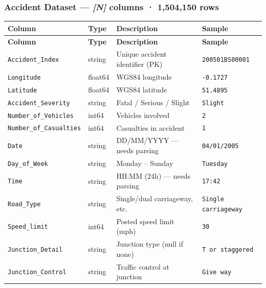 \documentclass[12pt, a4paper]{article}
\newcommand{\ph}[1]{{\color{phred}\textit{[#1]}}}
\begin{document}
\subsubsection{Accident Dataset — \ph{N} columns · 1,504,150 rows}

\begin{center}
\small
\renewcommand{\arraystretch}{1.3}
\begin{longtable}{L{4.2cm} C{2.2cm} L{4.5cm} L{2.6cm}}
\toprule
\textbf{Column} & \textbf{Type} & \textbf{Description} & \textbf{Sample} \\
\midrule
\endfirsthead
\toprule
\textbf{Column} & \textbf{Type} & \textbf{Description} & \textbf{Sample} \\
\midrule
\endhead
\bottomrule
\endlastfoot

\texttt{Accident\_Index}      & string  & Unique accident identifier (PK) & \texttt{200501BS00001} \\
\texttt{Longitude}            & float64 & WGS84 longitude                 & \texttt{-0.1727} \\
\texttt{Latitude}             & float64 & WGS84 latitude                  & \texttt{51.4895} \\
\texttt{Accident\_Severity}   & string  & Fatal / Serious / Slight        & \texttt{Slight} \\
\texttt{Number\_of\_Vehicles} & int64   & Vehicles involved               & \texttt{2} \\
\texttt{Number\_of\_Casualties}& int64  & Casualties in accident          & \texttt{1} \\
\texttt{Date}                 & string  & DD/MM/YYYY — needs parsing      & \texttt{04/01/2005} \\
\texttt{Day\_of\_Week}        & string  & Monday – Sunday                 & \texttt{Tuesday} \\
\texttt{Time}                 & string  & HH:MM (24h) — needs parsing     & \texttt{17:42} \\
\texttt{Road\_Type}           & string  & Single/dual carriageway, etc.   & \texttt{Single carriageway} \\
\texttt{Speed\_limit}         & int64   & Posted speed limit (mph)        & \texttt{30} \\
\texttt{Junction\_Detail}     & string  & Junction type (null if none)    & \texttt{T or staggered} \\
\texttt{Junction\_Control}    & string  & Traffic control at junction     & \texttt{Give way} \\

\end{longtable}
\end{center}
\end{document}
